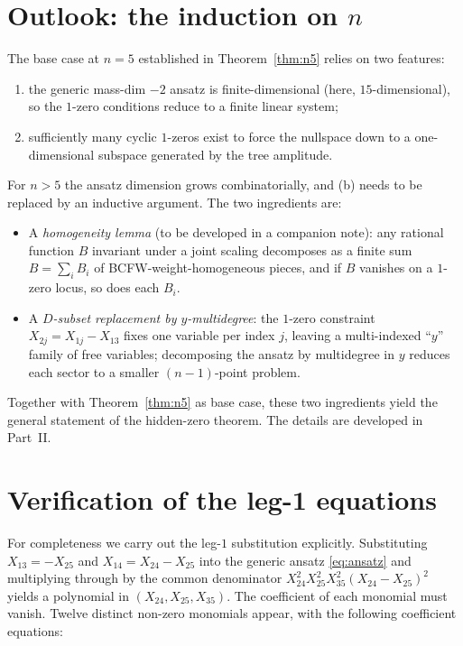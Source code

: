 \documentclass[11pt]{article}
\theoremstyle{plain}
\theoremstyle{definition}
\begin{document}
\section{Outlook: the induction on $n$}

The base case at $n=5$ established in Theorem~\ref{thm:n5} relies on two features:
\begin{enumerate}[label=(\alph*)]
\item the generic mass-dim $-2$ ansatz is finite-dimensional (here, $15$-dimensional),
      so the $1$-zero conditions reduce to a finite linear system;
\item sufficiently many cyclic $1$-zeros exist to force the nullspace down to a
      one-dimensional subspace generated by the tree amplitude.
\end{enumerate}
For $n > 5$ the ansatz dimension grows combinatorially, and (b) needs to be replaced
by an inductive argument. The two ingredients are:
\begin{itemize}
\item A \emph{homogeneity lemma} (to be developed in a companion note): any
      rational function $B$ invariant under a joint scaling decomposes as a finite
      sum $B = \sum_i B_i$ of BCFW-weight-homogeneous pieces, and if $B$ vanishes
      on a $1$-zero locus, so does each $B_i$.
\item A \emph{$D$-subset replacement by $y$-multidegree}: the $1$-zero constraint
      $X_{2j} = X_{1j} - X_{13}$ fixes one variable per index $j$, leaving a
      multi-indexed ``$y$'' family of free variables; decomposing the ansatz by
      multidegree in $y$ reduces each sector to a smaller $(n-1)$-point problem.
\end{itemize}
Together with Theorem~\ref{thm:n5} as base case, these two ingredients yield the
general statement of the hidden-zero theorem. The details are developed in Part~II.

\appendix

\section{Verification of the leg-1 equations}
\label{app:leg1}

For completeness we carry out the leg-$1$ substitution explicitly. Substituting
$X_{13} = -X_{25}$ and $X_{14} = X_{24} - X_{25}$ into the generic ansatz
\eqref{eq:ansatz} and multiplying through by the common denominator
$X_{24}^2 X_{25}^2 X_{35}^2 (X_{24} - X_{25})^2$ yields a polynomial in
$(X_{24}, X_{25}, X_{35})$. The coefficient of each monomial must vanish. Twelve
distinct non-zero monomials appear, with the following coefficient equations:
\end{document}
